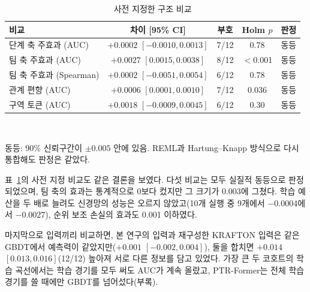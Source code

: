 \begin{table}[t]
\centering
\caption{사전 지정한 구조 비교}
\label{tab:prespec}
\footnotesize
\setlength{\tabcolsep}{2.5pt}
\begin{tabular}{lcccc}
\hline
비교 & 차이 [95\% CI] & 부호 & Holm $p$ & 판정 \\
\hline
단계 축 주효과 (AUC) & $+0.0002$ $[-0.0010, 0.0013]$ & 7/12 & 0.78 & 동등 \\
팀 축 주효과 (AUC) & $+0.0027$ $[0.0015, 0.0038]$ & 8/12 & $<$0.001 & 동등 \\
팀 축 주효과 (Spearman) & $+0.0002$ $[-0.0051, 0.0054]$ & 6/12 & 0.78 & 동등 \\
관계 편향 (AUC) & $+0.0006$ $[0.0001, 0.0010]$ & 7/12 & 0.036 & 동등 \\
구역 토큰 (AUC) & $+0.0018$ $[-0.0009, 0.0045]$ & 6/12 & 0.30 & 동등 \\
\hline
\end{tabular}
\\[2pt]
\parbox{\columnwidth}{\scriptsize 동등: 90\% 신뢰구간이 $\pm0.005$ 안에 있음. REML과 Hartung--Knapp 방식으로 다시 통합해도 판정은 같았다.}
\end{table}

표~\ref{tab:prespec}의 사전 지정 비교도 같은 결론을 보였다.
다섯 비교는 모두 실질적 동등으로 판정되었으며, 팀 축의 효과는 통계적으로 0보다 컸지만 그 크기가 0.003에 그쳤다.
학습 예산을 두 배로 늘려도 신경망의 성능은 오르지 않았고(10개 실행 중 9개에서 $-0.0004$에서 $-0.0027$), 순위 보조 손실의 효과도 0.001 이하였다.

마지막으로 입력끼리 비교하면, 본 연구의 입력과 재구성한 KRAFTON 입력은 같은 GBDT에서 예측력이 같았지만($+0.001$ $[-0.002, 0.004]$), 둘을 합치면 $+0.014$ $[0.013, 0.016]$(12/12) 높아져 서로 다른 정보를 담고 있었다.
가장 큰 두 코호트의 학습 곡선에서는 학습 경기를 모두 써도 AUC가 계속 올랐고, PTR-Former는 전체 학습 경기를 쓸 때에만 GBDT를 넘어섰다(부록).
